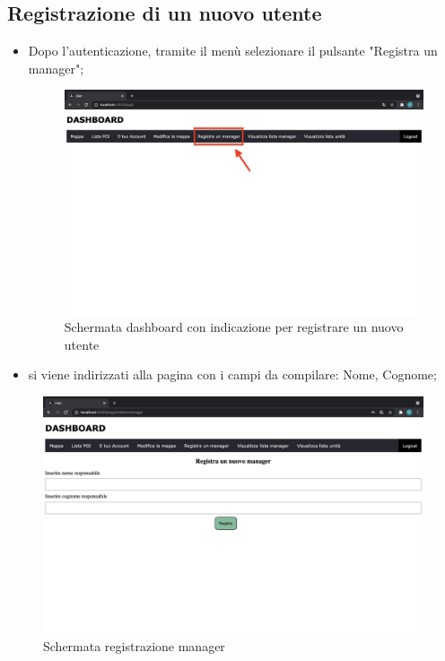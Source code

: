 \subsection{Registrazione di un nuovo utente}
\begin{itemize}
    \item Dopo l'autenticazione, tramite il menù selezionare il pulsante "Registra un manager";
    \begin{figure}[H]
        \centering
        \includegraphics[scale=0.12]{res/images/dashboard4.png}
        \caption{Schermata dashboard con indicazione per registrare un nuovo utente}
    \end{figure}
    \item si viene indirizzati alla pagina con i campi da compilare: Nome, Cognome;
\end{itemize}
\begin{figure}[H]
    \centering
    \includegraphics[scale=0.12]{res/images/newmanager.png}
    \caption{Schermata registrazione manager}
\end{figure}
